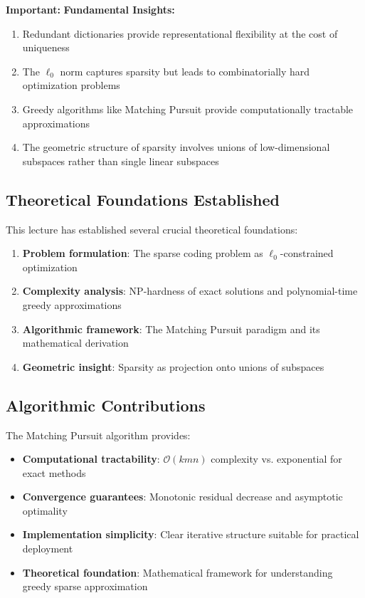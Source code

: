 \documentclass[12pt]{article}
\newenvironment{importantbox}
{\begin{framed}\noindent\textbf{Important:}\quad}
{\end{framed}}
\begin{document}
\begin{importantbox}
    \textbf{Fundamental Insights:}
    \begin{enumerate}
        \item Redundant dictionaries provide representational flexibility at the cost of uniqueness
        \item The $\ell_0$ norm captures sparsity but leads to combinatorially hard optimization problems
        \item Greedy algorithms like Matching Pursuit provide computationally tractable approximations
        \item The geometric structure of sparsity involves unions of low-dimensional subspaces rather than single linear subspaces
    \end{enumerate}
\end{importantbox}

\subsection{Theoretical Foundations Established}

This lecture has established several crucial theoretical foundations:

\begin{enumerate}
    \item \textbf{Problem formulation}: The sparse coding problem as $\ell_0$-constrained optimization
    \item \textbf{Complexity analysis}: NP-hardness of exact solutions and polynomial-time greedy approximations
    \item \textbf{Algorithmic framework}: The Matching Pursuit paradigm and its mathematical derivation
    \item \textbf{Geometric insight}: Sparsity as projection onto unions of subspaces
\end{enumerate}

\subsection{Algorithmic Contributions}

The Matching Pursuit algorithm provides:
\begin{itemize}
    \item \textbf{Computational tractability}: $\mathcal{O}(kmn)$ complexity vs. exponential for exact methods
    \item \textbf{Convergence guarantees}: Monotonic residual decrease and asymptotic optimality
    \item \textbf{Implementation simplicity}: Clear iterative structure suitable for practical deployment
    \item \textbf{Theoretical foundation}: Mathematical framework for understanding greedy sparse approximation
\end{itemize}
\end{document}
